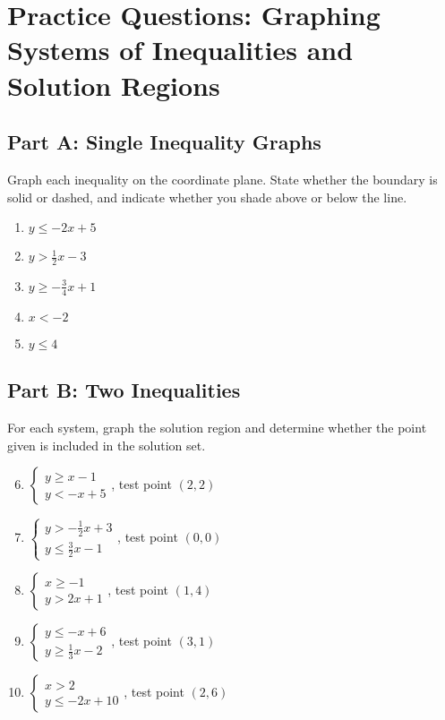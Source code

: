 \documentclass[12pt]{article}
\begin{document}
\newpage


\section*{Practice Questions: Graphing Systems of Inequalities and Solution Regions}

\subsection*{Part A: Single Inequality Graphs}
Graph each inequality on the coordinate plane. State whether the boundary is solid or dashed, and indicate whether you shade above or below the line.
\begin{enumerate}
  \item \(y \le -2x + 5\)
  \item \(y > \tfrac{1}{2}x - 3\)
  \item \(y \ge -\tfrac{3}{4}x + 1\)
  \item \(x < -2\)
  \item \(y \le 4\)
\end{enumerate}

\subsection*{Part B: Two Inequalities}
For each system, graph the solution region and determine whether the point given is included in the solution set.
\begin{enumerate}
  \setcounter{enumi}{5}
  \item \(\begin{cases} y \ge x - 1 \\ y < -x + 5 \end{cases}\), test point \((2,2)\)
  \item \(\begin{cases} y > -\tfrac{1}{2}x + 3 \\ y \le \tfrac{3}{2}x - 1 \end{cases}\), test point \((0,0)\)
  \item \(\begin{cases} x \ge -1 \\ y > 2x + 1 \end{cases}\), test point \((1,4)\)
  \item \(\begin{cases} y \le -x + 6 \\ y \ge \tfrac{1}{3}x - 2 \end{cases}\), test point \((3,1)\)
  \item \(\begin{cases} x > 2 \\ y \le -2x + 10 \end{cases}\), test point \((2,6)\)
\end{enumerate}
\end{document}
